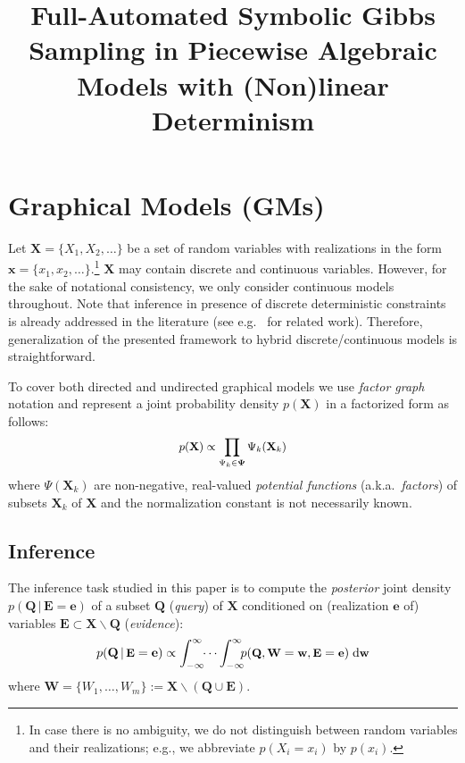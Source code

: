 \documentclass[]{article}
\title{Full-Automated Symbolic Gibbs Sampling in Piecewise Algebraic %
Models with (Non)linear Determinism}
\author{} %
\renewcommand{\vec}[1]{\mathbf{#1}}
\newcommand{\bvec}[1]{\textbf{#1}}
\newcommand{\pr}{p}
\newcommand{\dd}{\;\mathrm{d}} %
\begin{document}
\maketitle


\section{Graphical Models (GMs)}
\label{sect:background}
Let $\vec{X} = \{X_1, X_2, \ldots\}$ be a set of random variables with realizations in the form 
$\vec{x} = \{x_1, x_2, \ldots\}$.\footnote{
In case there is no ambiguity, we do not distinguish between random variables and their realizations; e.g., we abbreviate $\pr(X_i = x_i)$ by $\pr(x_i)$.}
$\vec{X}$ may contain discrete and continuous variables. 
However, for the sake of notational consistency, %
we only consider continuous models throughout. 
Note that inference in presence of discrete deterministic constraints is already addressed in the literature 
(see e.g.\ \citep{li2013dynamic} for related work).
Therefore, generalization of the presented framework to hybrid discrete/continuous models is straightforward.   

To cover both directed and undirected graphical models we use
\emph{factor graph} notation \citep{kschischang2001factor}
and represent a joint probability density $\pr(\vec{X})$ in a factorized form as follows: 
\begin{equation} \footnotesize
\label{e:factor-graph}
\pr(\vec{X}) \propto \prod_{\Psi_k \in \boldsymbol\Psi} \Psi_k (\vec{X}_k)
\end{equation}
where 
$\Psi(\vec{X}_k)$ are non-negative, real-valued \emph{potential functions} 
(a.k.a.\ \emph{factors}) of subsets $\bvec{X}_k$ of $\bvec{X}$ 
 and the normalization constant is not necessarily known.

\subsection{Inference}
The inference task studied in this paper is to compute the \emph{posterior} joint density 
$\pr(\bvec{Q} \,|\, \bvec{E}=\bvec{e})$
of 
a subset $\bvec{Q}$ (\emph{query}) of $\bvec{X}$ 
conditioned on (realization $\bvec{e}$ of) 
variables  
$\bvec{E} \subset\bvec{X} \backslash \bvec{Q}$ (\emph{evidence}):
\begin{equation}\vspace{-0.5mm}\footnotesize
\label{e:inference}
\pr(\vec{Q} \,|\, \bvec{E} =\vec{e}) \propto 
\int_{-\infty}^{\infty} \!\! \cdots \int_{-\infty}^{\infty}
\!\!\! \pr(\bvec{Q}, \bvec{W} = \bvec{w}, \bvec{E}=\bvec{e} )
 \dd \bvec{w}
\end{equation}
where $\bvec{W} = \{W_1, \ldots, W_m\} := \vec{X} \backslash (\vec{Q} \cup \vec{E})$. %
\end{document}
